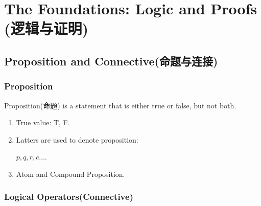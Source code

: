 \section[The Foundations: Logic and Proofs]{The Foundations: Logic and Proofs (逻辑与证明)}

\subsection{Proposition and Connective(命题与连接)}

\subsubsection{Proposition}

\begin{definition}
    \textcolor{light_red}{Proposition(命题)} is a statement that is either true or false, but not both. 
\end{definition}
\begin{enumerate}
    \item True value: T, F. 
    \item Latters are used to denote proposition:
    
    $p,q,r,c\dots$. 
    \item Atom and Compound Proposition. 
\end{enumerate}

\subsubsection{Logical Operators(Connective)}

